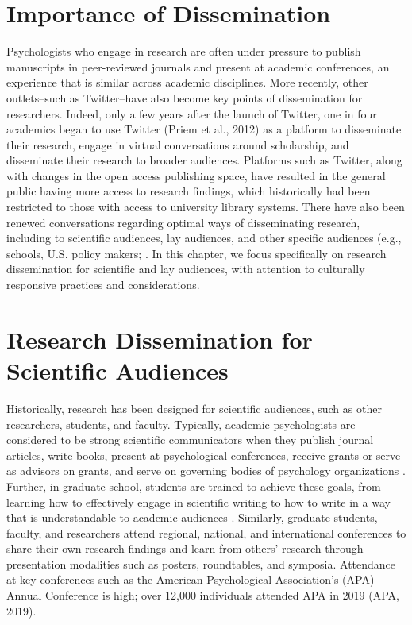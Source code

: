 \documentclass[
  11pt,
]{book}
\begin{document}
\section{Importance of Dissemination}\label{importance-of-dissemination}

Psychologists who engage in research are often under pressure to publish manuscripts in peer-reviewed journals and present at academic conferences, an experience that is similar across academic disciplines. More recently, other outlets--such as Twitter--have also become key points of dissemination for researchers. Indeed, only a few years after the launch of Twitter, one in four academics began to use Twitter (Priem et al., 2012) as a platform to disseminate their research, engage in virtual conversations around scholarship, and disseminate their research to broader audiences. Platforms such as Twitter, along with changes in the open access publishing space, have resulted in the general public having more access to research findings, which historically had been restricted to those with access to university library systems. There have also been renewed conversations regarding optimal ways of disseminating research, including to scientific audiences, lay audiences, and other specific audiences (e.g., schools, U.S. policy makers; \citep{ashcraft_strategies_2020, baker_dissemination_2021}. In this chapter, we focus specifically on research dissemination for scientific and lay audiences, with attention to culturally responsive practices and considerations.

\section{Research Dissemination for Scientific Audiences}\label{research-dissemination-for-scientific-audiences}

Historically, research has been designed for scientific audiences, such as other researchers, students, and faculty. Typically, academic psychologists are considered to be strong scientific communicators when they publish journal articles, write books, present at psychological conferences, receive grants or serve as advisors on grants, and serve on governing bodies of psychology organizations \citep{garvey_scientific_1965}. Further, in graduate school, students are trained to achieve these goals, from learning how to effectively engage in scientific writing \citep{sommer_dual_2006} to how to write in a way that is understandable to academic audiences \citep{lewis_communicating_2021}. Similarly, graduate students, faculty, and researchers attend regional, national, and international conferences to share their own research findings and learn from others' research through presentation modalities such as posters, roundtables, and symposia. Attendance at key conferences such as the American Psychological Association's (APA) Annual Conference is high; over 12,000 individuals attended APA in 2019 (APA, 2019).
\end{document}
